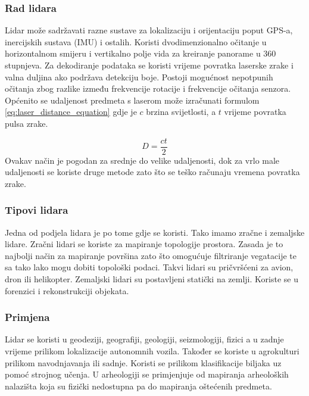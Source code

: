 \subsubsection{Rad lidara}
Lidar može sadržavati razne sustave za lokalizaciju i orijentaciju poput GPS-a, inercijskih sustava (IMU) i ostalih. Koristi dvodimenzionalno očitanje u horizontalnom smijeru i vertikalno polje vida za kreiranje panorame u 360 stupnjeva. Za dekodiranje podataka se koristi vrijeme povratka laserske zrake  i valna duljina ako podržava detekciju boje. Postoji mogućnost nepotpunih očitanja zbog razlike između frekvencije rotacije i frekvencije očitanja senzora. Općenito se udaljenost predmeta s laserom može izračunati formulom \ref{eq:laser_distance_equation} gdje je $c$ brzina svijetlosti, a $t$ vrijeme povratka pulsa zrake.

\begin{equation}
  D=\frac{ct}{2}
  \label{eq:laser_distance_equation}
\end{equation}
Ovakav način je pogodan za srednje do velike udaljenosti, dok za vrlo male udaljenosti se koriste druge metode zato što se teško računaju vremena povratka zrake.

\subsubsection{Tipovi lidara}

Jedna od podjela lidara je po tome gdje se koristi. Tako imamo zračne i zemaljske lidare. Zračni lidari se koriste za mapiranje topologije prostora. Zasada je to najbolji način za mapiranje površina zato što omogućuje filtriranje vegatacije te sa tako lako mogu dobiti topološki podaci. Takvi lidari su pričvršćeni za avion, dron ili helikopter. Zemaljski lidari su postavljeni statički na zemlji. Koriste se u forenzici i rekonstrukciji objekata. 

\subsubsection{Primjena}

Lidar se koristi u geodeziji, geografiji, geologiji, seizmologiji, fizici a u zadnje vrijeme prilikom lokalizacije autonomnih vozila. Također se koriste u agrokulturi prilikom navodnjavanja ili sadnje. Koristi se prilikom klasifikacije biljaka uz pomoć strojnog učenja. U arheologiji se primjenjuje od mapiranja arheoloških nalazišta koja su fizički nedostupna pa do mapiranja oštećenih predmeta.

